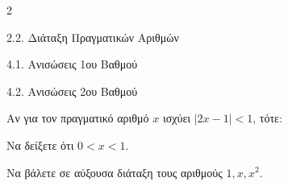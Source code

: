 \begin{ylh}{2}
    \item 2.2. Διάταξη Πραγματικών Αριθμών
    \item 4.1. Ανισώσεις 1ου Βαθμού
    \item 4.2. Ανισώσεις 2ου Βαθμού
\end{ylh}
Αν για τον πραγματικό αριθμό $x$ ισχύει $|2x - 1| < 1$, τότε:

\begin{alist}
\item Να δείξετε ότι $0 < x < 1$. 
\item Να βάλετε σε αύξουσα διάταξη τους αριθμούς $1, x, x^2$. 
\end{alist}

